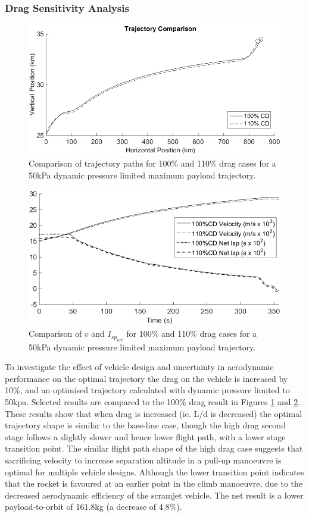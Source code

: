 \documentclass[]{aiaa-tc}
\newcommand{\PayloadToOrbitHighDrag}{161.8}
\begin{document}
\subsubsection{Drag Sensitivity Analysis}\label{subsection:dragvariation}
\begin{figure}[ht]
	\centering
	\includegraphics[width=.7\linewidth]{DragComparisonTraj}
	\caption{Comparison of trajectory paths for 100\% and 110\% drag cases for a 50kPa dynamic pressure limited maximum payload trajectory.}
	\label{fig:DragCompTraj}
\end{figure}

\begin{figure}[ht]
	\centering
	\includegraphics[width=.6\linewidth]{DragComparisonOther}
	\caption{Comparison of $v$ and $I_{sp_{net}}$ for 100\% and 110\% drag cases for a 50kPa dynamic pressure limited maximum payload trajectory.}
	\label{fig:DragCompOther}
\end{figure}

To investigate the effect of vehicle design and uncertainty in aerodynamic performance on the optimal trajectory the drag on the vehicle is increased by 10\%, and an optimised trajectory calculated with dynamic pressure limited to 50kpa. Selected results are compared to the 100\% drag result in Figures \ref{fig:DragCompTraj} and \ref{fig:DragCompOther}. 
These results show that when drag is increased (ie. L/d is decreased) the optimal trajectory shape is similar to the base-line case, though the high drag second stage follows a slightly slower and hence lower flight path, with a lower stage transition point. The similar flight path shape of the high drag case suggests that sacrificing velocity to increase separation altitude in a pull-up manoeuvre is optimal for multiple vehicle designs. Although the lower transition point indicates that the rocket is favoured at an earlier point in the climb manoeuvre, due to the decreased aerodynamic efficiency of the scramjet vehicle. 
The net result is  a lower payload-to-orbit of \PayloadToOrbitHighDrag kg (a decrease of 4.8\%). 
\end{document}
